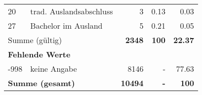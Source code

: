 \begin{longtable}{lXrrr}
     20 &
     \multicolumn{1}{X}{ trad. Auslandsabschluss   } &


       \num{3} &
       \num[round-mode=places,round-precision=2]{0.13} &
         \num[round-mode=places,round-precision=2]{0.03} \\

     27 &
     \multicolumn{1}{X}{ Bachelor im Ausland   } &


       \num{5} &
       \num[round-mode=places,round-precision=2]{0.21} &
         \num[round-mode=places,round-precision=2]{0.05} \\
     \midrule
     \multicolumn{2}{l}{Summe (gültig)} &
       \textbf{\num{2348}} &
     \textbf{\num{100}} &
       \textbf{\num[round-mode=places,round-precision=2]{22.37}} \\
     \multicolumn{5}{l}{\textbf{Fehlende Werte}}\\
       -998 &
       keine Angabe &
         \num{8146} &
        - &
         \num[round-mode=places,round-precision=2]{77.63} \\
     \midrule
     \multicolumn{2}{l}{\textbf{Summe (gesamt)}} &
          \textbf{\num{10494}} &
        \textbf{-} &
        \textbf{\num{100}} \\
     \bottomrule
     \end{longtable}
     
